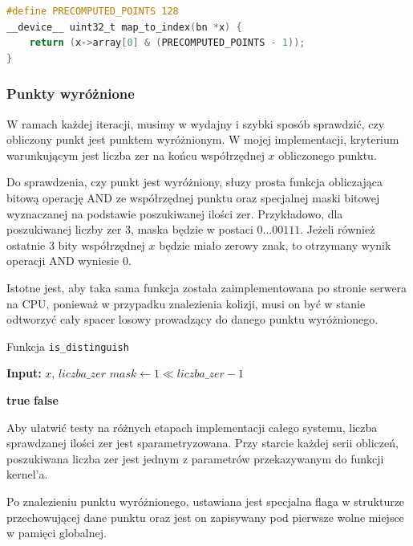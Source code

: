 \begin{lstlisting}[language=C, caption=Funkcja przydzielająca punkt]
#define PRECOMPUTED_POINTS 128
__device__ uint32_t map_to_index(bn *x) {
    return (x->array[0] & (PRECOMPUTED_POINTS - 1));
}
\end{lstlisting}


\subsubsection{Punkty wyróżnione}
W ramach każdej iteracji, musimy w wydajny i szybki sposób sprawdzić, czy obliczony punkt jest punktem wyróżnionym.
W mojej implementacji, kryterium warunkującym jest liczba zer na końcu współrzędnej $x$ obliczonego punktu.
\par
Do sprawdzenia, czy punkt jest wyróżniony, słuzy prosta funkcja obliczająca bitową operację AND ze
współrzędnej punktu oraz specjalnej maski bitowej wyznaczanej na podstawie poszukiwanej ilości zer.
Przykładowo, dla poszukiwanej liczby zer 3, maska będzie w postaci $0 ... 00111$. Jeżeli
również ostatnie 3 bity współrzędnej $x$ będzie miało zerowy znak, to otrzymany wynik operacji AND wyniesie 0.
\par
Istotne jest, aby taka sama funkcja została zaimplementowana po stronie serwera na CPU, ponieważ w przypadku znalezienia kolizji,
musi on być w stanie odtworzyć cały spacer losowy prowadzący do danego punktu wyróżnionego.

\begin{algorithm}
    \caption{Funkcja \texttt{is\_distinguish}}
    \begin{algorithmic}[1]
        \State \textbf{Input:} $x$, $liczba\_zer$
        \State $mask \gets 1 \ll liczba\_zer - 1$

        \State \Return \textbf{true}
        \Else
        \State \Return \textbf{false}
        \EndIf
    \end{algorithmic}
\end{algorithm}

\par
Aby ułatwić testy na różnych etapach implementacji całego systemu,
liczba sprawdzanej ilości zer jest sparametryzowana. Przy starcie każdej serii obliczeń, poszukiwana liczba zer jest jednym z parametrów przekazywanym
do funkcji kernel'a.
\par
Po znalezieniu punktu wyróżnionego, ustawiana jest specjalna flaga w strukturze przechowującej dane punktu oraz
jest on zapisywany pod pierwsze wolne miejsce w pamięci globalnej.

